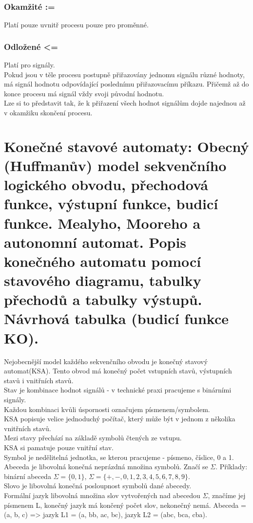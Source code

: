 \subsubsection{Okamžité :=}
Platí pouze uvnitř procesu pouze pro proměnné.\\
\subsubsection{Odložené <= }
Platí pro signály.\\
Pokud jsou v těle procesu postupně přiřazovány jednomu signálu různé hodnoty, má signál hodnotu odpovídající poslednímu přiřazovacímu příkazu. Přičemž až do konce procesu má signál vždy svoji původní hodnotu.\\
Lze si to představit tak, že k přiřazení všech hodnot signálům dojde najednou až v okamžiku skončení procesu.\\

\section{Konečné stavové automaty: Obecný (Huffmanův) model sekvenčního logického obvodu, přechodová funkce, výstupní funkce, budicí funkce. Mealyho, Mooreho a autonomní automat. Popis konečného automatu pomocí stavového diagramu, tabulky přechodů a tabulky výstupů. Návrhová tabulka (budicí funkce KO).}

Nejobecnější model každého sekvenčního obvodu je konečný stavový automat(KSA). Tento obvod má konečný počet vstupních stavů, výstupních stavů i vnitřních stavů. \\
Stav je kombinace hodnot signálů - v technické praxi pracujeme s binárními signály.\\
Každou kombinaci kvůli úspornosti označujem písmenem/symbolem.\\
KSA popisuje velice jednoduchý počítač, který může být v jednom z několika vnitřních stavů.\\
Mezi stavy přechází na základě symbolů čtených ze vstupu.\\
KSA si pamatuje pouze vnitřní stav.\\
Symbol je nedělitelná jednotka, se kterou pracujeme - písmeno, číslice, 0 a 1.\\
Abeceda je libovolná konečná neprázdná množina symbolů. Značí se \(\Sigma \). Příklady: binární abeceda \(\Sigma = \{0,1\} \), \(\Sigma = \{+,-,0,1,2,3,4,5,6,7,8,9\} \).\\
Slovo je libovolná konečná posloupnost symbolů dané abecedy.\\
Formální jazyk libovolná množina slov vytvořených nad abecedou \(\Sigma \), značíme jej písmenem L, konečný jazyk má končený počet slov, nekonečný nemá. Abeceda = (a, b, c) => jazyk L1 = (a, bb, ac, bc), jazyk L2 = (abc, bca, cba).\\

